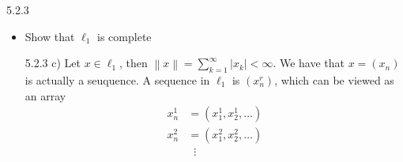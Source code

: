 \documentclass[a4paper,norsk]{article}
\renewcommand{\geq}{\geqslant}
\renewcommand{\epsilon}{\varepsilon}
\begin{document}
\begin{oppgavebox}{5.2.3}{}
\begin{itemize}
\begin{proofbox}{5.2.3 b)}{}
    Let $ \alpha_{k}^{} = x_k $. Then
    \[
        x - \sum_{k=1}^{N} x_k e_k = \left( 0, ..., 0, x_{N+1}, ... \right).
    \]

    This means that 
    \[
        \left\lVert x - \sum_{k=1}^{N} x_k e_k  \right\rVert = \sum_{k=N+1}^{\infty} \left| x_k \right|.
    \]
    Since $ x \in \ell_1 $, then $ \sum_{k=1}^{\infty} \left| x_k \right|    $ converges. This means that for large enough N, then 
    \[
        \sum_{k=1}^{\infty} \left| x_k \right|   - \sum_{k=1}^{N} \left| x_k \right|   < \epsilon.
    \]
    Which implies that $ \sum_{k=N+1}^{\infty} \left| x_k \right| < \epsilon    $. So $ \left( x_k \right)  $ is that unique sequence that we are looking for, with our basis $ \left( e_k \right)  $ from exercise 5.2.1.



    Now I have to prove that this sequence $ \left( x_k \right)  $ is unique. To do this, I let $ \left( a_k \right)  $ be another sequence, and find that $ \left\lVert \sum_{k=1}^{\infty} x_k e_k - \sum_{k=1}^{\infty} a_k e_k     \right\rVert = \lim_{n \to \infty} \left\lVert \sum_{k=1}^{n} x_k e_k - \sum_{k=1}^{n} a_k e_k    \right\rVert   $  does not converge.


    Let $ \left( a_k \right)  $ be another sequence. Then for at least one i, then $ \left| x_i - a_i \right| > \epsilon $. So $ \left\lVert x - \sum_{k=1}^{n} a_k e_k  =  \right\rVert = \left\lVert \left( x-1 - a-1, ..., x_n - a_n, x_{n+1}, ... \right)  \right\rVert  = \sum_{k=1}^{n} \left| x_k - a_k \right| + \sum_{k=n+1}^{\infty} \left| x_k \right|      $. Since $ \sum_{k=1}^{n} \left| x_k - a_k \right| \geq \epsilon  $ and $ \sum_{k=n+1}^{\infty} \left| x_k \right| < \epsilon     $, then $ \left\lVert x - \sum_{k=1}^{n} a_k e_k   \right\rVert > \epsilon   $. So $ x \neq \sum_{k=1}^{n} a_k e_k  $, which implies that $ \left( e_k \right)  $ is not a basis for $ \ell_1 $. And $ \left( x_k \right)  $ is a unique sequence such that
    \[
        x = \sum_{k=1}^{\infty} x_k e_k.
    \]  
  \end{proofbox}
  \item[c)] Show that $ \ell_1 $ is complete
  \begin{proofbox}{5.2.3 c)}{}
    Let $ x \in \ell_1 $, then $ \left\lVert x \right\rVert = \sum_{k=1}^{\infty} \left| x_k \right| < \infty   $. We have that $ x = \left( x_n \right)  $ is actually a seuquence. A sequence in $ \ell_1 $ is $ \left( x_n^r \right)  $, which can be viewed as an array
    \[
    \begin{aligned}
        x_n^1 &= \left( x_1^1, x_2^1, \dots \right) \\
        x_n^2 &= \left( x_1^2, x_2^2, \dots \right) \\
        &\;\;\vdots
    \end{aligned}
    \]


\end{proofbox}
\end{itemize}
\end{oppgavebox}
\end{document}
